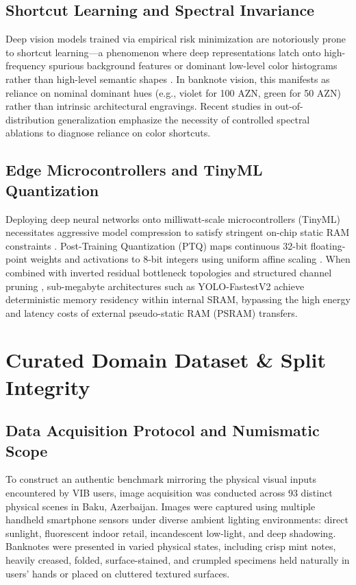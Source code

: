 \documentclass[conference]{IEEEtran}
\begin{document}
\subsection{Shortcut Learning and Spectral Invariance}
Deep vision models trained via empirical risk minimization are notoriously prone to shortcut learning---a phenomenon where deep representations latch onto high-frequency spurious background features or dominant low-level color histograms rather than high-level semantic shapes \cite{geirhos2020shortcut}. In banknote vision, this manifests as reliance on nominal dominant hues (e.g., violet for 100 AZN, green for 50 AZN) rather than intrinsic architectural engravings. Recent studies in out-of-distribution generalization \cite{hendrycks2019benchmarking} emphasize the necessity of controlled spectral ablations to diagnose reliance on color shortcuts.

\subsection{Edge Microcontrollers and TinyML Quantization}
Deploying deep neural networks onto milliwatt-scale microcontrollers (TinyML) necessitates aggressive model compression to satisfy stringent on-chip static RAM constraints \cite{david2021tensorflow,banbury2021benchmarking,warden2019tinyml}. Post-Training Quantization (PTQ) maps continuous 32-bit floating-point weights and activations to 8-bit integers using uniform affine scaling \cite{jacob2018quantization,dettmers2022llm}. When combined with inverted residual bottleneck topologies \cite{sandler2018mobilenetv2} and structured channel pruning \cite{he2017channel}, sub-megabyte architectures such as YOLO-FastestV2 achieve deterministic memory residency within internal SRAM, bypassing the high energy and latency costs of external pseudo-static RAM (PSRAM) transfers.

\section{Curated Domain Dataset \& Split Integrity}
\label{sec:dataset}

\subsection{Data Acquisition Protocol and Numismatic Scope}
To construct an authentic benchmark mirroring the physical visual inputs encountered by VIB users, image acquisition was conducted across 93 distinct physical scenes in Baku, Azerbaijan. Images were captured using multiple handheld smartphone sensors under diverse ambient lighting environments: direct sunlight, fluorescent indoor retail, incandescent low-light, and deep shadowing. Banknotes were presented in varied physical states, including crisp mint notes, heavily creased, folded, surface-stained, and crumpled specimens held naturally in users' hands or placed on cluttered textured surfaces.
\end{document}
